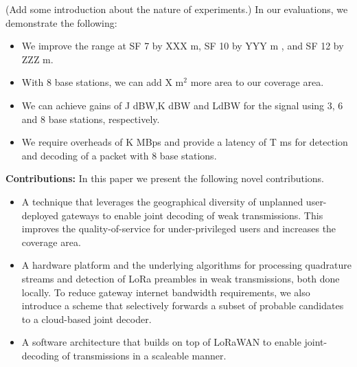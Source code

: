 
{\color{blue} (Add some introduction about the nature of experiments.)} In our evaluations, we demonstrate the following:
\begin{itemize}
    \item We improve the range at SF 7 by XXX m, SF 10 by YYY m , and SF 12 by
    ZZZ m.
    \item With 8 base stations, we can add X m$^2$ more area to our coverage area.
    \item We can achieve gains of J dBW,K dBW and LdBW for the signal using 3,
    6 and 8 base stations, respectively.
    \item We require overheads of K MBps and provide a latency of T ms for
    detection and decoding of a packet with 8 base stations.
\end{itemize}


\textbf{Contributions:} In this paper we present the following novel contributions.
\begin{itemize}
    \item A technique that leverages the geographical diversity of unplanned
    user-deployed gateways to enable joint decoding of weak transmissions.
    This improves the quality-of-service for under-privileged users and increases the coverage area.
    \item A hardware platform and the underlying algorithms for processing
    quadrature streams and detection of LoRa preambles in weak transmissions,
    both done locally. To reduce gateway internet bandwidth requirements, we
    also introduce a scheme that selectively forwards a subset of probable
    candidates to a cloud-based joint decoder.
    \item A software architecture that builds on top of LoRaWAN to enable
    joint-decoding of transmissions in a scaleable manner.
\end{itemize}